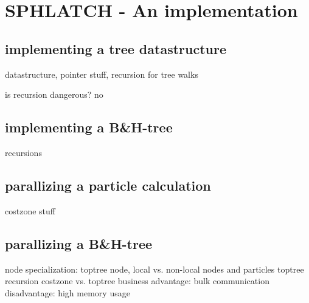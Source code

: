 
\section{SPHLATCH - An implementation}

\subsection{implementing a tree datastructure}

datastructure, pointer stuff, recursion for tree walks

is recursion dangerous? no

\subsection{implementing a B\&H-tree}

recursions

\subsection{parallizing a particle calculation}

costzone stuff

\subsection{parallizing a B\&H-tree}

node specialization: toptree node, local vs. non-local nodes and particles
toptree recursion
costzone vs. toptree business
advantage: bulk communication
disadvantage: high memory usage